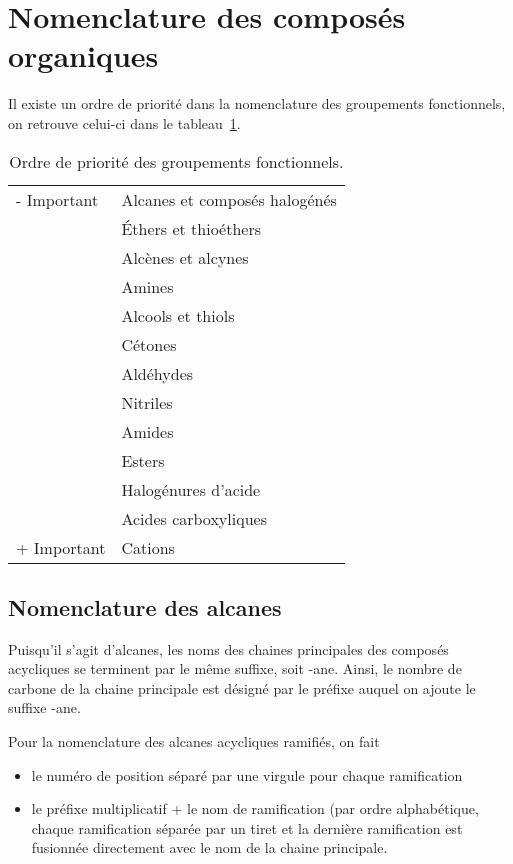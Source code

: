 \section{Nomenclature des composés organiques}

Il existe un ordre de priorité dans la nomenclature des groupements fonctionnels,
on retrouve celui-ci dans le tableau~\ref{tab:prioriteGroupements}.

\begin{table}
\begin{center}
\begin{tabular}{|l|l|}
  \hline
  - Important & Alcanes et composés halogénés \\
              &   \'Ethers et thioéthers\\
              & Alcènes et alcynes \\
              & Amines \\
              & Alcools et thiols \\
              & Cétones \\
              & Aldéhydes \\
              & Nitriles \\
              & Amides \\
              & Esters \\
              & Halogénures d'acide \\
              & Acides carboxyliques \\
  + Important & Cations \\
  \hline
\end{tabular}
\end{center}
\caption{Ordre de priorité des groupements fonctionnels.}
\label{tab:prioriteGroupements}
\end{table}

\subsection{Nomenclature des alcanes}
Puisqu'il s'agit d'alcanes, les noms des chaines principales des composés acycliques se terminent par le même suffixe, soit -ane.
Ainsi, le nombre de carbone de la chaine principale est désigné par le préfixe auquel on ajoute le suffixe -ane.

Pour la nomenclature des alcanes acycliques ramifiés, on fait
\begin{itemize}
  \item le numéro de position séparé par une virgule pour chaque ramification
  \item le préfixe multiplicatif + le nom de ramification (par ordre alphabétique, chaque ramification séparée par un tiret et la dernière ramification est fusionnée directement avec le nom de la chaine principale.
\end{itemize}

